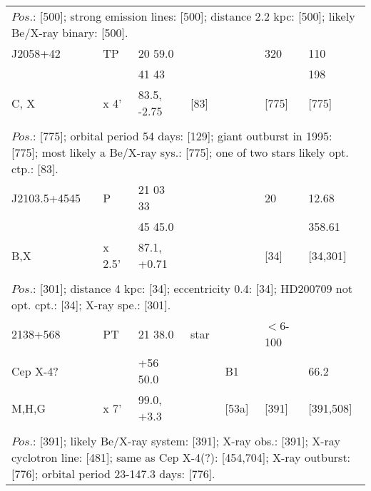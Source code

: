 \documentclass{aa}
\begin{document}
\begin{table*}[h]
\begin{tabular}{p{2.5cm}p{1cm}p{1.8cm}p{2.3cm}p{3.3cm}p{2.0cm}p{2.2cm}}
\\
\multicolumn{7}{p{17.5cm}}{
$Pos$.: [500]; strong emission lines: [500]; distance 2.2 kpc: [500]; likely Be/X-ray binary: [500].       }\\

\noalign{\smallskip}
\hline
\noalign{\smallskip}
J2058+42  &   TP   &    20 59.0        &                 &                 &         320         &      110  \\
                    &           &    41 43           &                 &                 &                         &     198   \\
C, X            &  x 4'   &  83.5, -2.75     &       [83]    &                 &      [775]          &    [775]  \\
  
\\
\multicolumn{7}{p{17.5cm}}{
$Pos$.: [775]; orbital period 54 days: [129]; giant outburst in 1995: [775]; most likely a Be/X-ray sys.: [775]; 
one of two stars likely opt. ctp.: [83].      }\\

\noalign{\smallskip}
\hline
\noalign{\smallskip}
J2103.5+4545 &   P      &  21 03 33       &              &               &         20             &        12.68     \\
                           &            &  45 45.0         &               &               &                          &       358.61 \\
B,X                    &  x 2.5' & 87.1, +0.71   &               &               &          [34]       &      [34,301]  \\
\\
\multicolumn{7}{p{17.5cm}}{
$Pos$.: [301];  distance 4 kpc: [34]; eccentricity 0.4: [34]; HD200709 not opt. cpt.: [34]; X-ray spe.: [301].    }\\

\noalign{\smallskip}
\hline
\noalign{\smallskip}
2138+568    & PT       & 21 38.0            &  star          &                          & $<$6-100        &                              \\
 Cep X-4?   &             & +56 50.0          &                    & B1                    &                          &        66.2              \\
  M,H,G        & x 7'      & 99.0, +3.3        &                    &  [53a]              & [391]                & [391,508]               \\
\\
\multicolumn{7}{p{17.5cm}}{
$Pos$.: [391]; likely Be/X-ray system: [391]; X-ray obs.: [391]; X-ray cyclotron line: [481]; same as Cep X-4(?): [454,704]; 
X-ray outburst: [776]; orbital period 23-147.3 days: [776].}\\


\end{tabular}
\end{table*}
\end{document}
